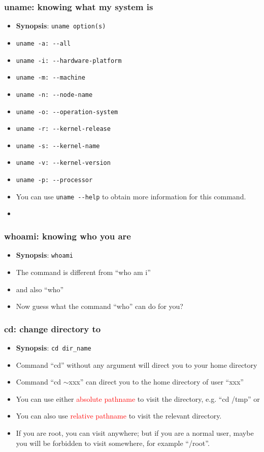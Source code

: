 \documentclass[red]{beamer}
\begin{document}
\begin{CJK*}{UTF8}{gbsn}
\begin{frame}
\frametitle{uname: knowing what my system is}
\begin{itemize}
    \item \textbf{Synopsis}: \lstinline{uname option(s)}
    \item \lstinline{uname -a: --all}
    \item \lstinline{uname -i: --hardware-platform}
    \item \lstinline{uname -m: --machine}
    \item \lstinline{uname -n: --node-name}
    \item \lstinline{uname -o: --operation-system}
    \item \lstinline{uname -r: --kernel-release}
    \item \lstinline{uname -s: --kernel-name}
    \item \lstinline{uname -v: --kernel-version}
    \item \lstinline{uname -p: --processor}
    \item You can use \lstinline{uname --help} to obtain more information for this command.
    \item \color{blue!80}{This command is very useful in compiling the system-dependent code.}
\end{itemize}
\end{frame}

\begin{frame}
\frametitle{whoami: knowing who you are}
\begin{itemize}
    \item \textbf{Synopsis}: \lstinline{whoami}
    \item The command is different from ``who am i''
    \item and also ``who''
    \item Now guess what the command ``who'' can do for you?
\end{itemize}
\end{frame}

\begin{frame}
\frametitle{cd: change directory to}
\begin{itemize}
    \item \textbf{Synopsis}: \texttt{cd dir\_name}
    \item Command ``cd'' without any argument will direct you to your home directory
    \item Command ``cd $\sim$xxx'' can direct you to the home directory of user ``xxx''
    \item You can use either \textcolor{red}{absolute pathname} to visit the directory, e.g. ``cd /tmp'' or
    \item You can also use \textcolor{red}{relative pathname} to visit the relevant directory.
    \item If you are root, you can visit anywhere; but if you are a normal user, maybe you will be
        forbidden to visit somewhere, for example ``/root''.
\end{itemize}
\end{frame}


\end{CJK*}
\end{document}
